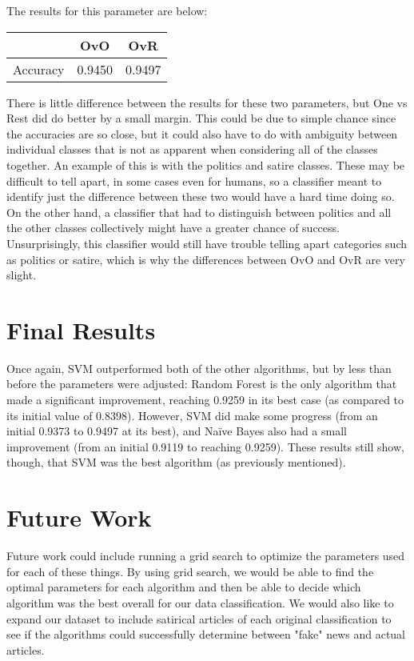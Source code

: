 \documentclass[fleqn,11pt]{article}
\begin{document}
\begin{multicols}{2}
{        The results for this parameter are below:}
        \begin{center}
            \begin{tabular}{|c|c|c|}
                \hline
                            & OvO       & OvR\\
                \hline
                Accuracy    & 0.9450    & 0.9497\\
                \hline
            \end{tabular}
        \end{center}
        There is little difference between the results for these two parameters, but One vs Rest 
        did do better by a small margin. This could be due to simple chance since the accuracies 
        are so close, but it could also have to do with ambiguity between individual classes that 
        is not as apparent when considering all of the classes together. An example of this is 
        with the politics and satire classes. These may be difficult to tell apart, in some cases 
        even for humans, so a classifier meant to identify just the difference between these two 
        would have a hard time doing so. On the other hand, a classifier that had to distinguish 
        between politics and all the other classes collectively might have a greater chance of 
        success. Unsurprisingly, this classifier would still have trouble telling apart categories 
        such as politics or satire, which is why the differences between OvO and OvR are very 
        slight.
    
    \section{Final Results}
    Once again, SVM outperformed both of the other algorithms, but by less than before the 
    parameters were adjusted: Random Forest is the only algorithm that made a significant 
    improvement, reaching 0.9259 in its best case (as compared to its initial value of 0.8398). 
    However, SVM did make some progress (from an initial 0.9373 to 0.9497 at its best), and Na\"ive 
    Bayes also had a small improvement (from an initial 0.9119 to reaching 0.9259). These results 
    still show, though, that SVM was the best algorithm (as previously mentioned).

    \section{Future Work}
    Future work could include running a grid search to optimize the parameters used for each of 
    these things. By using grid search, we would be able to find the optimal parameters for each 
    algorithm and then be able to decide which algorithm was the best overall for our data 
    classification. We would also like to expand our dataset to include satirical articles of each 
    original classification to see if the algorithms could successfully determine between "fake" 
    news and actual articles.
    \end{multicols}
\end{document}
